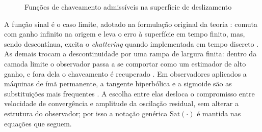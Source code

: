 \begin{figure}[H]
    \centering
    \caption{Funções de chaveamento admissíveis na superfície de deslizamento}
    \label{fig:funcoes_chaveamento}
\end{figure}

A função sinal é o caso limite, adotado na formulação original da teoria
\cite{Utkin1992}: comuta com ganho infinito na origem e leva o erro à
superfície em tempo finito, mas, sendo descontínua, excita o
\textit{chattering} quando implementada em tempo discreto \cite{Young1999}. As
demais trocam a descontinuidade por uma rampa de largura finita: dentro da
camada limite o observador passa a se comportar como um estimador de alto
ganho, e fora dela o chaveamento é recuperado \cite{SlotineLi1991}. Em
observadores aplicados a máquinas de ímã permanente, a tangente hiperbólica e a
sigmoide são as substituições mais frequentes \cite{Kim2011,Qiao2013}. A
escolha entre elas desloca o compromisso entre
velocidade de convergência e amplitude da oscilação residual, sem alterar a
estrutura do observador; por isso a notação genérica $\text{Sat}(\cdot)$ é
mantida nas equações que seguem.

